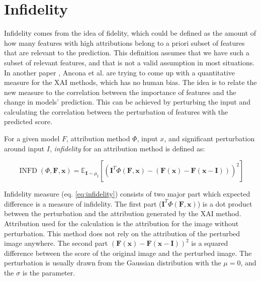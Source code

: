 \section{Infidelity}\label{section:infidelity}

Infidelity \cite{yeh2019fidelity} comes from the idea of fidelity, which could be defined as the amount of how many features with high attributions belong to a priori subset of features that are relevant to the prediction. This definition assumes that we have such a subset of relevant features, and that is not a valid assumption in most situations. In another paper \cite{ancona2017towards}, Ancona et al. are trying to come up with a quantitative measure for the XAI methods, which has no human bias. The idea is to relate the new measure to the correlation between the importance of features and the change in models' prediction. This can be achieved by perturbing the input and calculating the correlation between the perturbation of features with the predicted score.

\begin{definition}[Infidelity]\label{def:infidelity}
    For a given model $F$, attribution method $\Phi$, input $x$, and significant perturbation around input $I$, \textit{infidelity} for an attribution method is defined as:
    
    \begin{equation}
        \operatorname{INFD}(\Phi, \mathbf{F}, \mathbf{x})=\mathbb{E}_{\mathbf{I} \sim \mu_{\mathrm{I}}}\left[\left(\mathbf{I}^{T} \Phi(\mathbf{F}, \mathbf{x})-(\mathbf{F}(\mathbf{x})-\mathbf{F}(\mathbf{x}-\mathbf{I}))\right)^{2}\right]
        \label{eq:infidelity}
    \end{equation}

\end{definition}

Infidelity measure (eq. \ref{eq:infidelity}) consists of two major part which expected difference is a measure of infidelity. The first part ($\mathbf{I}^{T} \Phi(\mathbf{F}, \mathbf{x})$) is a dot product between the perturbation and the attribution generated by the XAI method. Attribution used for the calculation is the attribution for the image without perturbation. This method does not rely on the attribution of the perturbed image anywhere. The second part $(\mathbf{F}(\mathbf{x})-\mathbf{F}(\mathbf{x}-\mathbf{I}))^{2}$ is a squared difference between the score of the original image and the perturbed image. The perturbation is usually drawn from the Gaussian distribution with the $\mu = 0$, and the $\sigma$ is the parameter.


